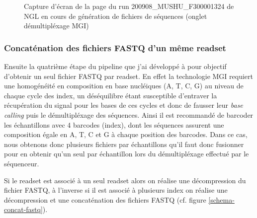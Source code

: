 \begin{figure}[H]
    \centering
    \caption{\footnotesize{Capture d'écran de la page du run 200908\_MUSHU\_F300001324 de NGL en cours de génération de fichiers de séquences (onglet \og démultipléxage MGI\fg{})}}
    \label{top-index}
\end{figure}

\subsubsection*{Concaténation des fichiers FASTQ d'un même readset}
Ensuite la quatrième étape du pipeline que j'ai développé à pour objectif d'obtenir un seul fichier FASTQ par readset.
En effet la technologie MGI requiert une homogénéité en composition en base nucléiques (A, T, C, G) au niveau de chaque cycle des index, un déséquilibre étant susceptible d'entraver la récupération du signal pour les bases de ces cycles et donc de fausser leur \emph{base calling} puis le démultipléxage des séquences.
Ainsi il est recommandé de \og barcoder \fg{} les échantillons avec 4 barcodes (index), dont les séquences assurent une composition égale en A, T, C et G à chaque position des barcodes.
Dans ce cas, nous obtenons donc plusieurs fichiers par échantillons qu'il faut donc fusionner pour en obtenir qu'un seul par échantillon lors du démultipléxage effectué par le séquenceur.

Si le readset est associé à un seul readset alors on réalise une décompression du fichier FASTQ, à l'inverse si il est associé à plusieurs index on réalise une décompression et une concaténation des fichiers FASTQ (cf. figure \ref{schema-concat-fastq}).

